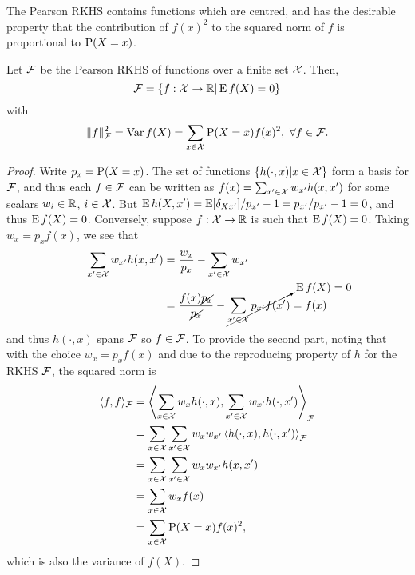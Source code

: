 The Pearson RKHS contains functions which are centred, and has the desirable property that the contribution of $f(x)^2$ to the squared norm of $f$ is proportional to $\operatorname{P}(X=x)$.

\begin{claim}
  Let ${\mathcal F}$ be the Pearson RKHS of functions over a finite set ${\mathcal X}$.
  Then,
  \[
    {\mathcal F} = \{f:{\mathcal X}\to\mathbb{R} | \operatorname{E} f(X) = 0 \}
  \]
  with
  \[
    \lVert f\rVert_{\mathcal F}^2 = \operatorname{Var} f(X) = \sum_{x\in{\mathcal X}} \operatorname{P}(X=x)f(x)^2, \ \forall f \in {\mathcal F}.
  \]
\end{claim}

\begin{proof}
  Write $p_x = \operatorname{P}(X=x)$.
  The set of functions $\{h(\cdot,x) | x \in {\mathcal X}\}$ form a basis for ${\mathcal F}$, and thus each $f \in {\mathcal F}$ can be written as $f(x) = \sum_{x'\in{\mathcal X}} w_{x'}h(x,x')$ for some scalars $w_i\in\mathbb{R}$, $i\in{\mathcal X}$.
  But $\operatorname{E} h(X,x') = \operatorname{E} [\delta_{Xx'}] / p_{x'} - 1 = p_{x'} / p_{x'} - 1 = 0$, and thus $\operatorname{E} f(X) = 0$.
  Conversely, suppose $f:{\mathcal X}\to\mathbb{R}$ is such that $\operatorname{E} f(X) = 0$.
  Taking $w_x = p_xf(x)$, we see that
  \begin{align*}
    \sum_{x'\in{\mathcal X}} w_{x'}h(x,x') 
    &= \frac{w_x}{p_x} - \sum_{x'\in{\mathcal X}} w_{x'} \\
    &= \frac{f(x)\cancel{p_x}}{\cancel{p_x}} - \cancelto{\operatorname{E} f(X) = 0}{\sum_{x'\in{\mathcal X}} p_{x'}f(x')} = f(x)
  \end{align*}
  and thus $h(\cdot,x)$ spans ${\mathcal F}$ so $f\in{\mathcal F}$.
  To provide the second part, noting that with the choice $w_x = p_xf(x)$ and due to the reproducing property of $h$ for the RKHS ${\mathcal F}$, the squared norm is 
  \begin{align*}
    \langle f,f\rangle_{\mathcal F} 
    &= \left\langle \sum_{x\in{\mathcal X}} w_{x}h(\cdot,x), \sum_{x'\in{\mathcal X}} w_{x'}h(\cdot,x') \right\rangle_{\mathcal F} \\
    &= \sum_{x\in{\mathcal X}} \sum_{x'\in{\mathcal X}} w_{x} w_{x'} \left\langle h(\cdot,x), h(\cdot,x') \right\rangle_{\mathcal F} \\
    &= \sum_{x\in{\mathcal X}} \sum_{x'\in{\mathcal X}} w_{x} w_{x'} h(x,x')  \\
    &= \sum_{x\in{\mathcal X}} w_{x} f(x) \\
    &= \sum_{x\in{\mathcal X}} \operatorname{P}(X=x) f(x)^2,
  \end{align*}
  which is also the variance of $f(X)$.
\end{proof}



